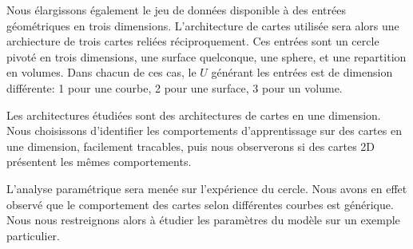 \documentclass[../main]{subfiles}
\begin{document}
Nous élargissons également le jeu de données disponible à des entrées géométriques en trois dimensions. L'architecture de cartes utilisée sera alors une archiecture de trois cartes reliées réciproquement.
Ces entrées sont un cercle pivoté en trois dimensions, une surface quelconque, une sphere, et une repartition en volumes. Dans chacun de ces cas, le $U$ générant les entrées est de dimension différente: 1 pour une courbe,  2 pour une surface, 3 pour un volume.

Les architectures étudiées sont des architectures de cartes en une dimension. Nous choisissons d'identifier les comportements d'apprentissage sur des cartes en une dimension, facilement tracables, puis nous observerons si des cartes 2D présentent les mêmes comportements.

L'analyse paramétrique sera menée sur l'expérience du cercle. Nous avons en effet observé que le comportement des cartes selon différentes courbes est générique. Nous nous restreignons alors à étudier les paramètres du modèle sur un exemple particulier.
\end{document}
